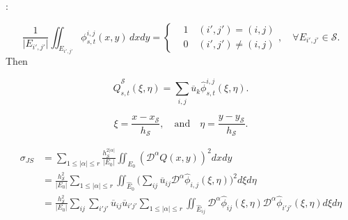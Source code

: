 \documentclass[usenames,dvipsnames,letterpaper,landscape,final]{slides}
\theoremstyle{definition}
\begin{document}
\begin{myslide}

:

\begin{equation*}\label{eq:basispoly}
		  \frac{1}{\lvert E_{i',j'}\rvert } \iint_{E_{i',j'}} \phi^{i,j}_{s,t} (x,y)\, dxdy = 
		  \left \{
					 \begin{aligned}
								&1 \quad  (i',j') = (i,j)\\
								&0 \quad  (i',j') \neq (i,j)
					 \end{aligned}
					 \right. 
					 ,\quad \forall E_{i',j'} \in \mathcal{S}.
\end{equation*}
Then
		  \parbox{0.6\textwidth}{\raggedright
\begin{equation*}\label{eq:normalizedstencilpoly}
		  \hat{Q}^{\mathcal{S}}_{s,t}(\xi, \eta) = \sum_{i,j} \overline{u}_k \hat{\phi}_{s,t}^{i,j}(\xi, \eta).
\end{equation*}
		  }\parbox{0.4\textwidth}{\raggedright
\begin{equation*}
\xi = \frac{x-x_\mathcal{S}}{h_\mathcal{S}},\quad \text{and} \quad \eta = \frac{y-y_\mathcal{S}}{h_\mathcal{S}}.
\end{equation*}
		  }

\begin{equation*}\label{eq:JSsmoothnessIC}
\begin{aligned}
		  \sigma_{JS} &= \sum_{1\leq \lvert \alpha \rvert \leq r}  \frac{h_\mathcal{S}^{2\lvert\alpha\rvert}}{\lvert E_0 \rvert} 
		  \iint_{E_0} (\mathcal{D}^\alpha Q(x,y))^2 dx dy\\
					  &= \frac{h_\mathcal{S}^2}{\lvert E_0 \rvert}\sum_{1\leq \lvert \alpha \rvert \leq r} \iint_{\hat{E}_0} \big( \sum_{ij} \overline{u}_{ij} \mathcal{D}^\alpha \hat{\phi}_{i,j}(\xi, \eta) \big)^2 d\xi d\eta \\
					  &= \frac{h_\mathcal{S}^2}{\lvert E_0 \rvert}\sum_{ij} \sum_{i'j'} \overline{u}_{ij} \overline{u}_{i'j'} \sum_{1\leq \lvert \alpha \rvert \leq r} 
					  \iint_{\hat{E}_{ij}} \mathcal{D}^\alpha \hat{\phi}_{ij}(\xi, \eta) 
					  \mathcal{D}^\alpha \hat{\phi}_{i'j'}(\xi, \eta) d\xi d\eta \\
\end{aligned}
\end{equation*}

\end{myslide}
\end{document}
